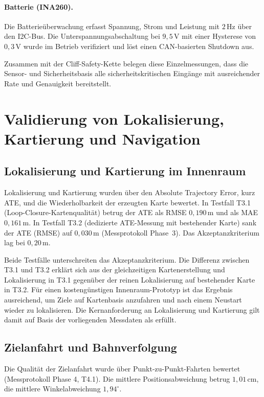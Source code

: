 \paragraph{Batterie (INA260).}
Die Batterieüberwachung erfasst Spannung, Strom und Leistung mit $2\,\mathrm{Hz}$ über den I2C-Bus. Die Unterspannungsabschaltung bei $9{,}5\,\mathrm{V}$ mit einer Hysterese von $0{,}3\,\mathrm{V}$ wurde im Betrieb verifiziert und löst einen CAN-basierten Shutdown aus.

Zusammen mit der Cliff-Safety-Kette belegen diese Einzelmessungen, dass die Sensor- und Sicherheitsbasis alle sicherheitskritischen Eingänge mit ausreichender Rate und Genauigkeit bereitstellt.

\section{Validierung von Lokalisierung, Kartierung und Navigation}

\subsection{Lokalisierung und Kartierung im Innenraum}

Lokalisierung und Kartierung wurden über den Absolute Trajectory Error, kurz ATE, und die Wiederholbarkeit der erzeugten Karte bewertet. In Testfall T3.1 (Loop-Closure-Kartenqualität) betrug der ATE als RMSE $0{,}190\,\mathrm{m}$ und als MAE $0{,}161\,\mathrm{m}$. In Testfall T3.2 (dedizierte ATE-Messung mit bestehender Karte) sank der ATE (RMSE) auf $0{,}030\,\mathrm{m}$ (Messprotokoll Phase~3). Das Akzeptanzkriterium lag bei $0{,}20\,\mathrm{m}$.

Beide Testfälle unterschreiten das Akzeptanzkriterium. Die Differenz zwischen T3.1 und T3.2 erklärt sich aus der gleichzeitigen Kartenerstellung und Lokalisierung in T3.1 gegenüber der reinen Lokalisierung auf bestehender Karte in T3.2. Für einen kostengünstigen Innenraum-Prototyp ist das Ergebnis ausreichend, um Ziele auf Kartenbasis anzufahren und nach einem Neustart wieder zu lokalisieren. Die Kernanforderung an Lokalisierung und Kartierung gilt damit auf Basis der vorliegenden Messdaten als erfüllt.

\subsection{Zielanfahrt und Bahnverfolgung}

Die Qualität der Zielanfahrt wurde über Punkt-zu-Punkt-Fahrten bewertet (Messprotokoll Phase 4, T4.1). Die mittlere Positionsabweichung betrug $1{,}01\,\mathrm{cm}$, die mittlere Winkelabweichung $1{,}94^\circ$.

